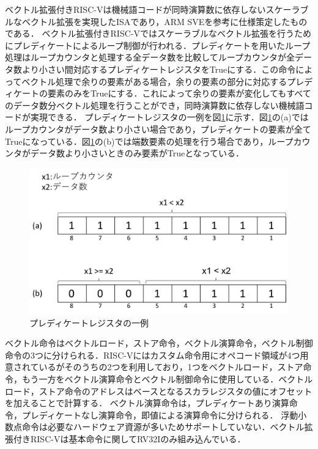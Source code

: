 
ベクトル拡張付きRISC-Vは機械語コードが同時演算数に依存しないスケーラブルなベクトル拡張を実現したISAであり，ARM SVEを参考に仕様策定したものである．
ベクトル拡張付きRISC-Vではスケーラブルなベクトル拡張を行うためにプレディケートによるループ制御が行われる．プレディケートを用いたループ処理はループカウンタと処理する全データ数を比較してループカウンタが全データ数より小さい間対応するプレディケートレジスタをTrueにする．この命令によってベクトル処理で余りの要素がある場合，余りの要素の部分に対応するプレディケートの要素のみをTrueにする．これによって余りの要素が変化してもすべてのデータ数分ベクトル処理を行うことができ，同時演算数に依存しない機械語コードが実現できる．
プレディケートレジスタの一例を図\ref{fig:predicate}に示す．図\ref{fig:predicate}の(a)ではループカウンタがデータ数より小さい場合であり，プレディケートの要素が全てTrueになっている．図\ref{fig:predicate}の(b)では端数要素の処理を行う場合であり，ループカウンタがデータ数より小さいときのみ要素がTrueとなっている．


\begin{figure}[b]
    \centering
    \includegraphics[scale=0.5]{image/predicate.pdf}
    \caption{プレディケートレジスタの一例}
    \label{fig:predicate}
\end{figure}

ベクトル命令はベクトルロード，ストア命令，ベクトル演算命令，ベクトル制御命令の3つに分けられる．RISC-Vにはカスタム命令用にオペコード領域が4つ用意されているがそのうちの2つを利用しており，1つをベクトルロード，ストア命令，もう一方をベクトル演算命令とベクトル制御命令に使用している．ベクトルロード，ストア命令のアドレスはベースとなるスカラレジスタの値にオフセットを加えることで計算する．
ベクトル演算命令は，プレディケートあり演算命令，プレディケートなし演算命令，即値による演算命令に分けられる．
浮動小数点命令は必要なハードウェア資源が多いためサポートしていない．ベクトル拡張付きRISC-Vは基本命令に関してRV32Iのみ組み込んでいる．

